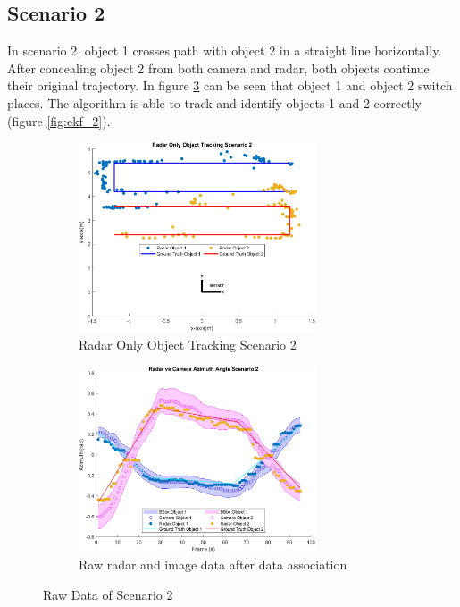 \subsection{Scenario 2}\label{sec:3-exp_result2}
In scenario 2, object 1 crosses path with object 2 in a straight line horizontally.
After concealing object 2 from both camera and radar, both objects continue their original trajectory.
In figure \ref*{fig:raw_2} can be seen that object 1 and object 2 switch places.
The algorithm is able to track and identify objects 1 and 2 correctly (figure \ref*{fig:ekf_2}).
\href{https://drive.google.com/file/d/1YnliV7YRzahYNpIehctzrNrf0Z0ZpIeY/view?usp=sharing}{\color{blue}{Video}}
\begin{figure}[!htb]
    \hspace{0.1\textwidth}
    \begin{subfigure}[b]{0.3\textwidth}%
        \includegraphics[width=7cm]{Figures/matlab/Radar Only Object Tracking Scenario 2.png}
        \caption{Radar Only Object Tracking Scenario 2}
        \label{subfig:radar_2}
    \end{subfigure}
    \hspace{0.1\textwidth}
    \begin{subfigure}[b]{0.3\textwidth}%
        \includegraphics[width=7cm]{Figures/matlab/Radar vs Camera Azimuth Angle Scenario 2.png}
        \caption{Raw radar and image data after data association}
        \label{subfig:raw_fusion_2}
    \end{subfigure}

    \caption{Raw Data of Scenario 2}
    \label{fig:raw_2}
\end{figure}

